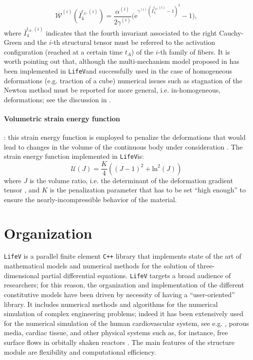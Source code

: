 \documentclass[a4paper, 10pt,twoside]{article}
\theoremstyle{plain}
\theoremstyle{definition}
\theoremstyle{remark}
\newcommand{\lv}{\texttt{LifeV}\space}
\newcommand{\isoWe}{\overline{\mathcal{W}}}
\newcommand{\Ue}{\mathcal{U}}
\begin{document}
\begin{itemize}
\begin{equation}
    \displaystyle \isoWe^{(i)}\left( \overline{I}_4^{t_A,(i)} \right) = \displaystyle  \frac{\alpha^{(i)}}{2\gamma^{(i)}}\bigg( \text{e}^{\gamma^{(i)}( \overline{I}_4^{t_A,(i)}-1)^2} - 1\bigg),
    \label{multimechSingle}
  \end{equation}
  where $\overline{I}_4^{t_A,(i)}$ indicates that the fourth invariant associated to the right Cauchy-Green and the $i$-th structural tensor \cite{book::Holzapfel2000} must be referred to the activation configuration (reached at a certain time $t_A$) of the $i$-th family of fibers. It is worth pointing out that, although the multi-mechanism model proposed in \cite{thesis::DalongLi} has been implemented in \lv and successfully used in the case of homogeneous deformations (e.g. traction of a cube) numerical issues such as stagnation of the Newton method must be reported for more general, i.e. in-homogeneous, deformations; see the discussion in \cite{thesis::Tricerri}.
\end{itemize}

\paragraph{Volumetric strain energy function}: this strain energy function is employed to penalize the deformations that would lead to changes in the volume of the continuous body under consideration \cite{book::Holzapfel2000,thesis::Tricerri}. The strain energy function implemented in \lv is:
\begin{equation}
  \displaystyle \Ue(J) = \frac{K}{4}\left( (J-1)^2 +\text{ln}^2(J)\right)
  \label{volumStrain}
\end{equation}
where $J$ is the volume ratio, i.e. the determinant of the deformation gradient tensor \cite{book::Holzapfel2000}, and $K$ is the penalization parameter that has to be set ``high enough'' to ensure the nearly-incompressible behavior of the material.

\section{Organization}
\texttt{LifeV} \cite{LifeV} is a parallel finite element \texttt{C++} library that implements state of the art of mathematical models and numerical methods for the solution of three-dimensional partial differential equations. \texttt{LifeV} targets a broad audience of researchers; for this reason, the organization and implementation of the different constitutive models have been driven by necessity of having  a ``user-oriented'' library. It includes numerical methods and algorithms for the numerical simulation of complex engineering problems; indeed it has been extensively used for the numerical simulation of the human cardiovascular system, see e.g. \cite{thesis::Crosetto,thesis::Malossi}, porous media, cardiac tissue, and other physical systems such as, for instance, free surface flows in orbitally shaken reactors \cite{thesis::Quinodoz}. The main features of the structure module are flexibility and computational efficiency.
\end{document}
